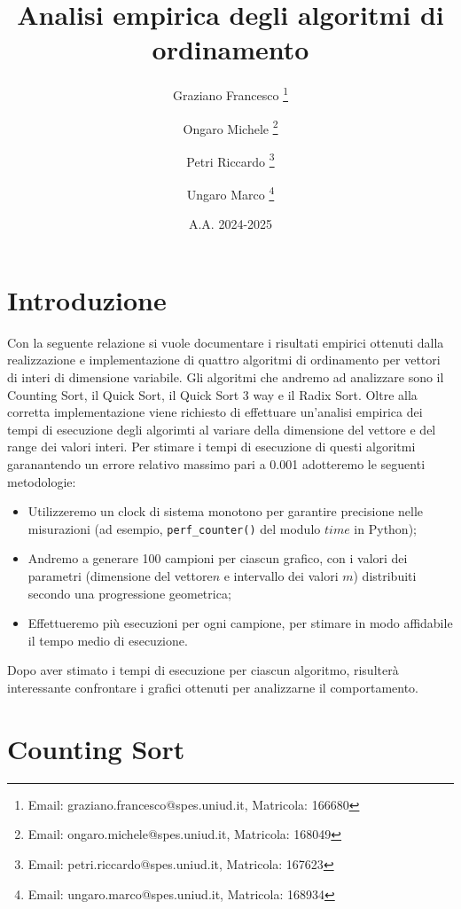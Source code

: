 \documentclass[a4paper, 12pt, oneside]{book}
\title{Analisi empirica degli algoritmi di ordinamento}
\author[ ]{Graziano Francesco \thanks{Email: graziano.francesco@spes.uniud.it, Matricola: 166680}}
\author[ ]{Ongaro Michele \thanks{Email: ongaro.michele@spes.uniud.it, Matricola: 168049}}
\author[ ]{Petri Riccardo \thanks{Email: petri.riccardo@spes.uniud.it, Matricola: 167623}}
\author[ ]{Ungaro Marco \thanks{Email: ungaro.marco@spes.uniud.it, Matricola: 168934}}
\affil[ ]{Università degli Studi di Udine, Dipartimento di Scienze matematiche, informatiche e fisiche}
\date{A.A. 2024-2025}
\begin{document}
\renewcommand{\contentsname}{Contenuti}
\renewcommand{\chaptername}{Capitolo}

\maketitle %
\tableofcontents %

\chapter{Introduzione}\label{chap:Introduzione} %

Con la seguente relazione si vuole documentare i risultati empirici ottenuti dalla realizzazione e implementazione di quattro algoritmi di ordinamento per vettori di interi di dimensione variabile.
Gli algoritmi che andremo ad analizzare sono il Counting Sort, il Quick Sort, il Quick Sort 3 way e il Radix Sort.
Oltre alla corretta implementazione viene richiesto di effettuare un'analisi empirica dei tempi di esecuzione degli algorimti al variare della dimensione del vettore e del range dei valori interi. Per stimare i tempi di esecuzione di questi algoritmi garanantendo un errore relativo massimo pari a 0.001 adotteremo le seguenti metodologie:

\begin{itemize}
    \item Utilizzeremo un clock di sistema monotono per garantire precisione nelle misurazioni (ad esempio, \texttt{perf\_counter()} del modulo \(time\) in Python);
    \item Andremo a generare 100 campioni per ciascun grafico, con i valori dei parametri (dimensione del vettore\(n\) e intervallo dei valori \(m\)) distribuiti secondo una progressione geometrica;
    \item Effettueremo più esecuzioni per ogni campione, per stimare in modo affidabile il tempo medio di esecuzione.
\end{itemize}

\noindent Dopo aver stimato i tempi di esecuzione per ciascun algoritmo, risulterà interessante confrontare i grafici ottenuti per analizzarne il comportamento. 



 
\chapter{Counting Sort}\label{chap:Counting Sort} %
\end{document}

